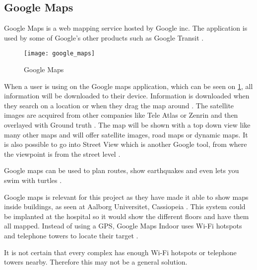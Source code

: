 \subsection{Google Maps}
Google Maps is a web mapping service hosted by Google inc. The application is used by some of Google's other products such as Google Transit  \cite{Goo_transist}. 

\begin{figure}[ht!]
    \centering
    \texttt{[image: google\_maps]}
    \caption{Google Maps}
    \label{fig:google_maps}
  \end{figure}

When a user is using on the Google maps application, which can be seen on \cref{fig:google_maps}, all information will be downloaded to their device. Information is downloaded when they search on a location or when they drag the map around  \cite{Goo_input}. The satellite images are acquired from other companies like Tele Atlas \cite{Goo_Tele} or Zenrin \cite{Goo_Zenrin} and then overlayed with Ground truth \cite{Goo_GT}.
The map will be shown with a top down view like many other maps and will offer satellite images, road maps or dynamic maps. It is also possible to go into Street View which is another Google tool, from where the viewpoint is from the street level \cite{Goo_street}.

Google maps can be used to plan routes, show earthquakes and even lets you swim with turtles \cite{Goo_Turtle}.

Google maps is relevant for this project as they have made it able to show maps inside buildings, as seen at Aalborg Universitet, Cassiopeia \cite{Goo_Indoor1}. This system could be implanted at the hospital so it would show the different floors and have them all mapped. Instead of using a GPS, Google Maps Indoor uses Wi-Fi hotspots and telephone towers to locate their target \cite{Goo_Indoor}.

It is not certain that every complex has enough Wi-Fi hotspots or telephone towers nearby. Therefore this may not be a general solution.